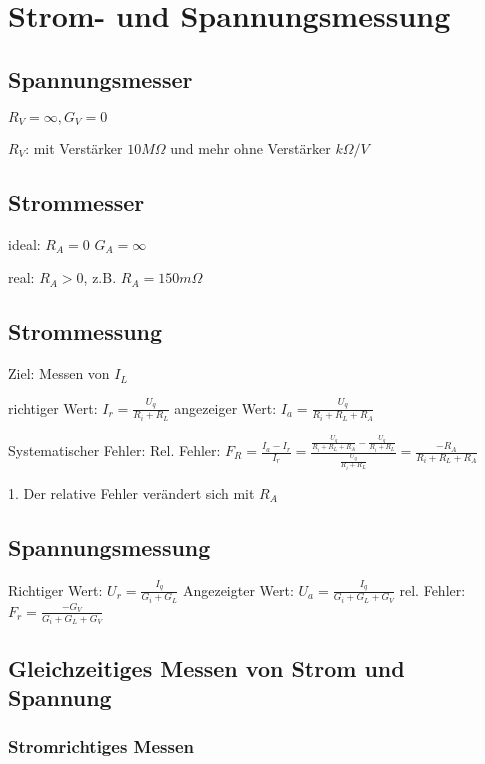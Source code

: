 \documentclass[german]{article}
\newcommand{\ohm}{\Omega}
\begin{document}

\section{Strom- und Spannungsmessung}

\subsection{Spannungsmesser}

$R_V = \infty, G_V = 0$

$R_V$: mit Verstärker $10M\ohm$ und mehr
			 ohne Verstärker $k\ohm/V$

\subsection{Strommesser}

ideal:
$R_A = 0$
$G_A = \infty$

real:
$R_A > 0$, z.B. $R_A = 150 m\ohm$

\subsection{Strommessung}

Ziel: Messen von $I_L$

richtiger Wert: $I_r = \frac{U_q}{R_i + R_L}$
angezeiger Wert: $I_a = \frac{U_q}{R_i + R_L + R_A}$

Systematischer Fehler:
Rel. Fehler: $F_R = \frac{I_a - I_r}{I_r} = \frac{\frac{U_q}{R_i + R_L + R_A} - \frac{U_q}{R_i + R_L}}{\frac{U_q}{R_i + R_L}} = \frac{-R_A}{R_i + R_L + R_A}$

1. Der relative Fehler verändert sich mit $R_A$

\subsection{Spannungsmessung}

Richtiger Wert: $U_r = \frac{I_q}{G_i + G_L}$
Angezeigter Wert: $U_a = \frac{I_q}{G_i + G_L + G_V}$
rel. Fehler: $F_r = \frac{-G_V}{G_i + G_L + G_V}$

\subsection{Gleichzeitiges Messen von Strom und Spannung}

\subsubsection{Stromrichtiges Messen}
\end{document}
